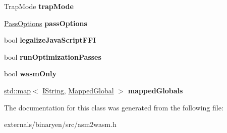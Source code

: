 \begin{DoxyCompactItemize}
Trap\+Mode {\bfseries trap\+Mode}
\item 
\mbox{\label{classwasm_1_1_asm2_wasm_builder_a29763de05f5fcd70c9ca4ab1b30326cb}} 
\mbox{\hyperlink{structwasm_1_1_pass_options}{Pass\+Options}} {\bfseries pass\+Options}
\item 
\mbox{\label{classwasm_1_1_asm2_wasm_builder_a370b12676f7dbdde53ba61bc63d3cb1e}} 
bool {\bfseries legalize\+Java\+Script\+F\+FI}
\item 
\mbox{\label{classwasm_1_1_asm2_wasm_builder_a206b3d2036eb294d7ee935c029404fc9}} 
bool {\bfseries run\+Optimization\+Passes}
\item 
\mbox{\label{classwasm_1_1_asm2_wasm_builder_a0ead5140b6e8d8f048f80df8c0e35a48}} 
bool {\bfseries wasm\+Only}
\item 
\mbox{\label{classwasm_1_1_asm2_wasm_builder_a85051b72dce3b97e4f17053c62aac025}} 
\mbox{\hyperlink{classstd_1_1map}{std\+::map}}$<$ \mbox{\hyperlink{structcashew_1_1_i_string}{I\+String}}, \mbox{\hyperlink{structwasm_1_1_asm2_wasm_builder_1_1_mapped_global}{Mapped\+Global}} $>$ {\bfseries mapped\+Globals}
\end{DoxyCompactItemize}


The documentation for this class was generated from the following file\+:\begin{DoxyCompactItemize}
\item 
externals/binaryen/src/asm2wasm.\+h\end{DoxyCompactItemize}

